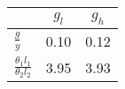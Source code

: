 \begin{tiny}\begin{tabular}{|l|c|c|}
\hline
&\textbf{$g_l$}&\textbf{$g_h$}\\\hline
\textbf{$\frac{g}{y}$}&0.10&0.12\\\hline
\textbf{$\frac{\theta_1 l_1}{\theta_2 l_2}$}&3.95&3.93\\\hline
\end{tabular}
\end{tiny}